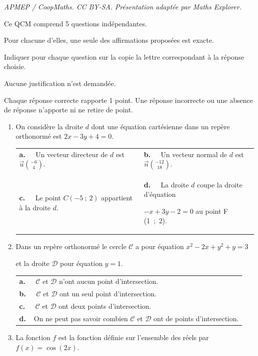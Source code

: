 \documentclass[10pt]{article}
\providecommand{\vv}[1]{\overrightarrow{#1}}
\providecommand{\vv}[1]{{\overrightarrow{#1}}}
\begin{document}
\noindent\textit{APMEP / CoopMaths. CC BY-SA. Présentation adaptée par Maths Explorer.}\par\medskip
\medskip

Ce QCM comprend 5 questions indépendantes.

Pour chacune d'elles, une seule des affirmations proposées est exacte.
 
Indiquer pour chaque question sur la copie la lettre correspondant à la réponse choisie.

 Aucune justification n'est demandée.
 
Chaque réponse correcte rapporte 1 point. Une réponse incorrecte ou une absence de réponse n'apporte ni ne retire de point.

\begin{enumerate}
\item On considère la droite $d$ dont une équation cartésienne dans un repère orthonormé est $2x-3y+4=0$.

\begin{tabularx}{\linewidth}{*{2}{X}}
\textbf{a.~~} Un vecteur directeur de $d$ est $\vv{u} \binom{-6}{4}$. &\textbf{b.~~} Un vecteur normal de $d$ est $\vv{n}\binom{-12}{18}$. \\
\textbf{c.~~} Le point $ C(-5~;~2)$ appartient à la droite $d$.& \textbf{d.~~} La droite $d$ coupe la droite d'équation 

$-x+3y-2=0$ au point F (1~;~2).
\end{tabularx}

\item Dans un repère orthonormé le cercle $\mathcal{C}$ a pour équation $x^2-2x+y^2+y=3$ 

et la droite $\mathcal{D}$ pour équation $y=1$.


\begin{tabularx}{\linewidth}{*{1}{X}}
\textbf{a.~~} $\mathcal{C}$ et $\mathcal{D}$ n'ont aucun point d'intersection.\\
\textbf{b.~~} $\mathcal{C}$ et $\mathcal{D}$ ont un seul point d'intersection.\\
\textbf{c.~~} $\mathcal{C}$ et $\mathcal{D}$ ont deux points d'intersection.\\
\textbf{d.~~}On ne peut pas savoir combien $\mathcal{C}$ et $\mathcal{D}$ ont de points d'intersection.\\
\end{tabularx}

\item La fonction $f$ est la fonction définie sur l'ensemble des réels par $f(x)= \cos(2x)$.


\end{enumerate}
\end{document}
